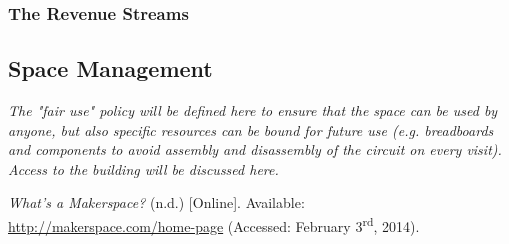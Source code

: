 \documentclass[a4paper, 11pt]{article}
\begin{document}
\subsubsection{The Revenue Streams}


\subsection{Space Management}
\textit{The "fair use" policy will be defined here to ensure that the space can be used by anyone, but also specific resources can be bound for future use (e.g. breadboards and components to avoid assembly and disassembly of the circuit on every visit). Access to the building will be discussed here.}

\newpage

\begin{thebibliography}{9}
     \emph{What’s a Makerspace?} (n.d.) [Online]. Available: \\ \href{http://makerspace.com/home-page}{http://makerspace.com/home-page} (Accessed: February 3\textsuperscript{rd}, 2014).
\end{thebibliography}
\end{document}
